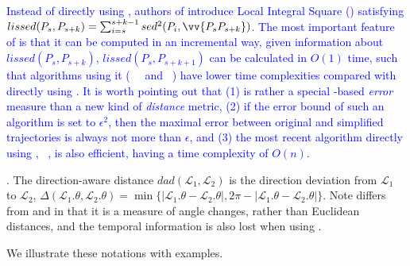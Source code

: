 \textcolor{blue}{Instead of directly using \sed, authors of \cite{Chen:Fast} introduce Local Integral Square \sed (\lissed) satisfying $lissed(P_s,P_{s+k}) = \sum_{i=s}^{s+k-1} sed^2(P_i, \vv{P_sP_{s+k}})$. The most important feature of \lissed is that it can be computed in an incremental way, \ie given information about $lissed(P_s,P_{s+k})$, $lissed(P_s,P_{s+k+1})$ can be calculated in $O(1)$ time, such that algorithms using it (\eg~\bumr~\cite{Chen:Fast} and \dagots~\cite{Cao:Dots}) have lower time complexities compared with directly using \sed. 
It is worth pointing out that (1) \lissed is rather a special \sed-based \emph{error} measure than a new kind of \emph{distance} metric, (2) if the \lissed error bound of such an algorithm is set to $\epsilon^2$, then the maximal \sed error between original and simplified trajectories is always not more than $\epsilon$, and (3) the most recent algorithm directly using \sed, \ie~\cised, is also efficient, having a time complexity of $O(n)$.}


. The direction-aware distance $dad\left(\mathcal{L}_1, \mathcal{L}_2\right)$ is the direction deviation from $\mathcal{L}_1$ to $\mathcal{L}_2$, \ie $\Delta\left(\mathcal{L}_1.\theta, \mathcal{L}_2.\theta\right) = \min\{|\mathcal{L}_1.\theta - \mathcal{L}_2.\theta|, 2\pi - |\mathcal{L}_1.\theta - \mathcal{L}_2.\theta|\}$.
{Note \dad differs from \ped and \sed in that it is a measure of angle changes, rather than Euclidean distances, and the temporal information is also lost when using \dad.}





We illustrate these notations with examples.


